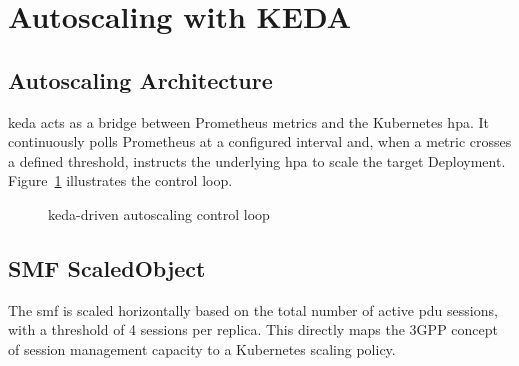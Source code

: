 \section{Autoscaling with KEDA}
\label{sec:keda_autoscaling}

\subsection{Autoscaling Architecture}

\gls{keda} acts as a bridge between Prometheus metrics and the Kubernetes \gls{hpa}. It continuously polls Prometheus at a configured interval and, when a metric crosses a defined threshold, instructs the underlying \gls{hpa} to scale the target Deployment. Figure~\ref{fig:keda_architecture} illustrates the control loop.

\begin{figure}[H]
  \centering
  \caption{\gls{keda}-driven autoscaling control loop}
  \label{fig:keda_architecture}
\end{figure}

\subsection{SMF ScaledObject}
\label{sec:smf_scaled}

The \gls{smf} is scaled horizontally based on the total number of active \gls{pdu} sessions, with a threshold of 4 sessions per replica. This directly maps the 3GPP concept of session management capacity to a Kubernetes scaling policy.

